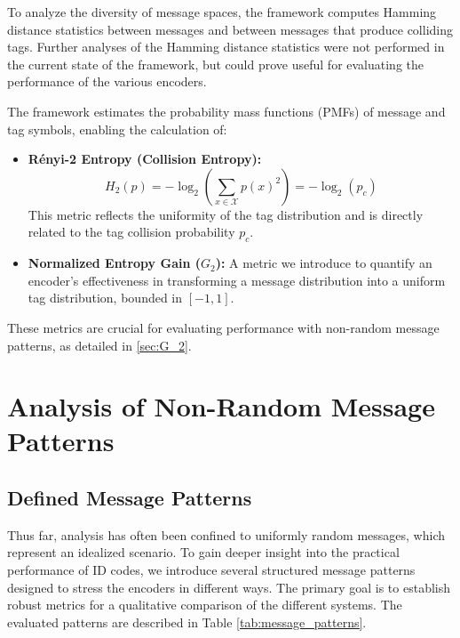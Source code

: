 \documentclass[english,BCOR=4mm,cdfont=false]{tudscrreprt} %
\begin{document}
To analyze the diversity of message spaces, the framework computes Hamming distance statistics between messages and between messages that produce colliding tags. Further analyses of the Hamming distance statistics were not performed in the current state of the framework, but could prove useful for evaluating the performance of the various encoders.

The framework estimates the probability mass functions (PMFs) of message and tag symbols, enabling the calculation of:
\begin{itemize}
    \item \textbf{Rényi-2 Entropy (Collision Entropy):}
    \begin{equation}
        H_2(p) = -\log_2 \left( \sum_{x \in \mathcal{X}} p(x)^2 \right) = -\log_2(p_c)
    \end{equation}
    This metric reflects the uniformity of the tag distribution and is directly related to the tag collision probability $p_c$.
    \item \textbf{Normalized Entropy Gain ($G_2$):} A metric we introduce to quantify an encoder's effectiveness in transforming a message distribution into a uniform tag distribution, bounded in $[-1, 1]$.
\end{itemize}
These metrics are crucial for evaluating performance with non-random message patterns, as detailed in \ref{sec:G_2}.

\section{Analysis of Non-Random Message Patterns}
\label{sec:nonRandom}
\subsection{Defined Message Patterns}
Thus far, analysis has often been confined to uniformly random messages, which represent an idealized scenario. To gain deeper insight into the practical performance of ID codes, we introduce several structured message patterns designed to stress the encoders in different ways. The primary goal is to establish robust metrics for a qualitative comparison of the different systems. The evaluated patterns are described in Table \ref{tab:message_patterns}.
\end{document}
